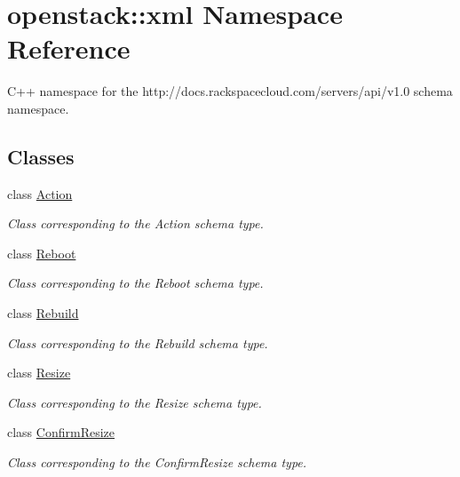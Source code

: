 \hypertarget{namespaceopenstack_1_1xml}{
\section{openstack::xml Namespace Reference}
\label{namespaceopenstack_1_1xml}
}


C++ namespace for the http://docs.rackspacecloud.com/servers/api/v1.0 schema namespace.  


\subsection*{Classes}
\begin{DoxyCompactItemize}
\item 
class \hyperlink{classopenstack_1_1xml_1_1Action}{Action}
\begin{DoxyCompactList}\small\item\em Class corresponding to the Action schema type. \item\end{DoxyCompactList}\item 
class \hyperlink{classopenstack_1_1xml_1_1Reboot}{Reboot}
\begin{DoxyCompactList}\small\item\em Class corresponding to the Reboot schema type. \item\end{DoxyCompactList}\item 
class \hyperlink{classopenstack_1_1xml_1_1Rebuild}{Rebuild}
\begin{DoxyCompactList}\small\item\em Class corresponding to the Rebuild schema type. \item\end{DoxyCompactList}\item 
class \hyperlink{classopenstack_1_1xml_1_1Resize}{Resize}
\begin{DoxyCompactList}\small\item\em Class corresponding to the Resize schema type. \item\end{DoxyCompactList}\item 
class \hyperlink{classopenstack_1_1xml_1_1ConfirmResize}{ConfirmResize}
\begin{DoxyCompactList}\small\item\em Class corresponding to the ConfirmResize schema type. \item\end{DoxyCompactList}\item 

\end{DoxyCompactItemize}

